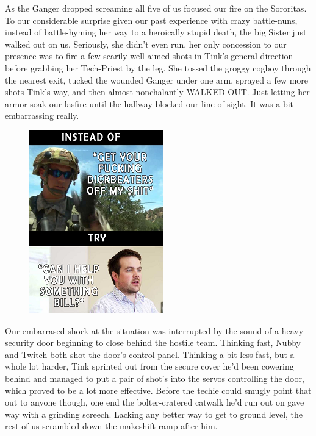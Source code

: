 As the Ganger dropped screaming all five of us focused our fire on the Sororitas. 
To our considerable surprise given our past experience with crazy battle-nuns, instead of battle-hyming her way to a heroically stupid death, the big Sister just walked out on us. 
Seriously, she didn't even run, her only concession to our presence was to fire a few scarily well aimed shots in Tink's general direction before grabbing her Tech-Priest by the leg. 
She tossed the groggy cogboy through the nearest exit, tucked the wounded Ganger under one arm, sprayed a few more shots Tink's way, and then almost nonchalantly WALKED OUT. 
Just letting her armor soak our lasfire until the hallway blocked our line of sight. 
It was a bit embarrassing really.

\begin{figure}
	\begin{center}
		\includegraphics[width=\figwidth]{pics/18/15.png}
	\end{center}
\end{figure}
Our embarrased shock at the situation was interrupted by the sound of a heavy security door beginning to close behind the hostile team. 
Thinking fast, Nubby and Twitch both shot the door's control panel. 
Thinking a bit less fast, but a whole lot harder, Tink sprinted out from the secure cover he'd been cowering behind and managed to put a pair of shot's into the servos controlling the door, which proved to be a lot more effective. 
Before the techie could smugly point that out to anyone though, one end the bolter-cratered catwalk he'd run out on gave way with a grinding screech. 
Lacking any better way to get to ground level, the rest of us scrambled down the makeshift ramp after him.

